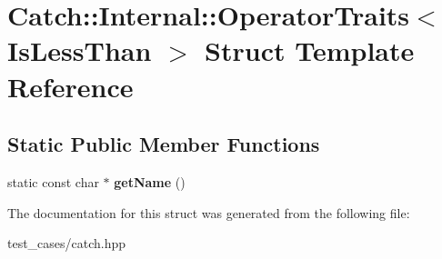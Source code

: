 \hypertarget{structCatch_1_1Internal_1_1OperatorTraits_3_01IsLessThan_01_4}{}\section{Catch\+:\+:Internal\+:\+:Operator\+Traits$<$ Is\+Less\+Than $>$ Struct Template Reference}
\label{structCatch_1_1Internal_1_1OperatorTraits_3_01IsLessThan_01_4}
\subsection*{Static Public Member Functions}
\begin{DoxyCompactItemize}
\item 
\mbox{\label{structCatch_1_1Internal_1_1OperatorTraits_3_01IsLessThan_01_4_aa3b536ddbd2e34b1253931ff00c32712}} 
static const char $\ast$ {\bfseries get\+Name} ()
\end{DoxyCompactItemize}


The documentation for this struct was generated from the following file\+:\begin{DoxyCompactItemize}
\item 
test\+\_\+cases/catch.\+hpp\end{DoxyCompactItemize}
